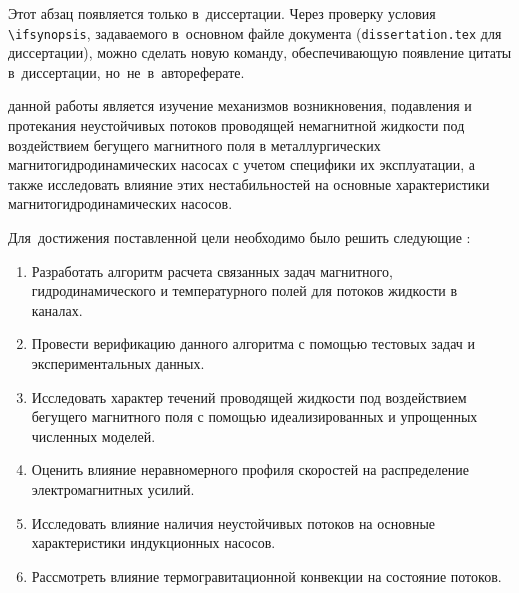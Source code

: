 
{\actuality} 
\else
Этот абзац появляется только в~диссертации.
Через проверку условия \verb!\!\verb!ifsynopsis!, задаваемого в~основном файле
документа (\verb!dissertation.tex! для диссертации), можно сделать новую
команду, обеспечивающую появление цитаты в~диссертации, но~не~в~автореферате.
\fi

{\aim} данной работы является изучение механизмов возникновения, подавления и протекания неустойчивых потоков проводящей немагнитной жидкости под воздействием бегущего магнитного поля в металлургических магнитогидродинамических насосах с учетом специфики их эксплуатации, а также исследовать влияние этих нестабильностей на основные характеристики магнитогидродинамических насосов.

Для~достижения поставленной цели необходимо было решить следующие {\tasks}:
\begin{enumerate}[beginpenalty=10000] %
  \item Разработать алгоритм расчета связанных задач магнитного, гидродинамического и температурного полей для потоков жидкости в каналах.
  \item Провести верификацию данного алгоритма с помощью тестовых задач и экспериментальных данных.
  \item Исследовать характер течений проводящей жидкости под воздействием бегущего магнитного поля с помощью идеализированных и упрощенных численных моделей. 
  \item Оценить влияние неравномерного профиля скоростей на распределение  электромагнитных усилий. 
  \item Исследовать влияние наличия неустойчивых потоков на основные характеристики индукционных насосов.
  \item Рассмотреть влияние термогравитационной конвекции на состояние потоков.  
\end{enumerate}


